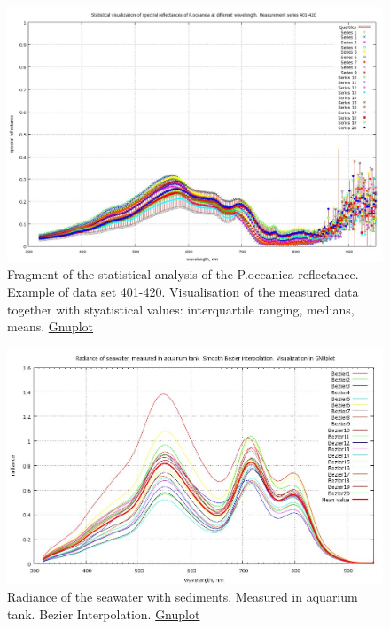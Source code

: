 \documentclass[10pt, a4paper]{article}
\begin{document}
\begin{appendices}
\begin{figure}[h]
	\begin{center}
	\includegraphics[scale=0.20]{GNU-Stat-M-401-420.jpg}
	\caption{Fragment of the statistical analysis of the P.oceanica reflectance. Example of data set 401-420. 
		Visualisation of the measured data together with styatistical values: interquartile ranging, medians, means. \href{http://www.gnuplot.info/}{Gnuplot}}
	\label{fig:A.15}
	\end{center}
\end{figure}

\begin{figure}[H]
	\centering
	\includegraphics[scale=0.25]{GNU-Radiance_Bezier.jpg}
	\caption{Radiance of the seawater with sediments. Measured in aquarium tank. Bezier Interpolation. \href{http://www.gnuplot.info/}{Gnuplot}}
	\label{fig:A.16}
\end{figure}


\end{appendices}
\end{document}
